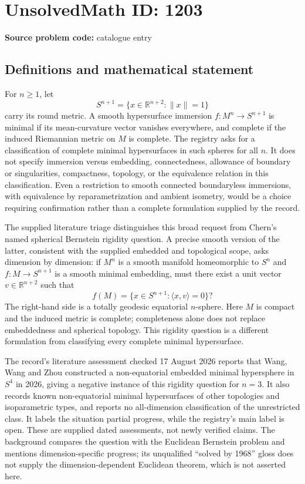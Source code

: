 \documentclass[11pt]{article}
\newcommand{\R}{\mathbb{R}}
\begin{document}
\section*{UnsolvedMath ID: 1203}
\textbf{Source problem code:} catalogue entry
\subsection{Definitions and mathematical statement}
For $n\ge1$, let
\[
 S^{n+1}=\{x\in\R^{n+2}:\|x\|=1\}
\]
carry its round metric. A smooth hypersurface immersion $f:M^n\to S^{n+1}$ is minimal if its mean-curvature vector vanishes everywhere, and complete if the induced Riemannian metric on $M$ is complete. The registry asks for a classification of complete minimal hypersurfaces in such spheres for all $n$. It does not specify immersion versus embedding, connectedness, allowance of boundary or singularities, compactness, topology, or the equivalence relation in this classification. Even a restriction to smooth connected boundaryless immersions, with equivalence by reparametrization and ambient isometry, would be a choice requiring confirmation rather than a complete formulation supplied by the record.

The supplied literature triage distinguishes this broad request from Chern's named spherical Bernstein rigidity question. A precise smooth version of the latter, consistent with the supplied embedded and topological scope, asks dimension by dimension: if $M^n$ is a smooth manifold homeomorphic to $S^n$ and $f:M\to S^{n+1}$ is a smooth minimal embedding, must there exist a unit vector $v\in\R^{n+2}$ such that
\[
 f(M)=\{x\in S^{n+1}:\langle x,v\rangle=0\}?
\]
The right-hand side is a totally geodesic equatorial $n$-sphere. Here $M$ is compact and the induced metric is complete; completeness alone does not replace embeddedness and spherical topology. This rigidity question is a different formulation from classifying every complete minimal hypersurface.

The record's literature assessment checked 17 August 2026 reports that Wang, Wang and Zhou constructed a non-equatorial embedded minimal hypersphere in $S^4$ in 2026, giving a negative instance of this rigidity question for $n=3$. It also records known non-equatorial minimal hypersurfaces of other topologies and isoparametric types, and reports no all-dimension classification of the unrestricted class. It labels the situation partial progress, while the registry's main label is open. These are supplied dated assessments, not newly verified claims. The background compares the question with the Euclidean Bernstein problem and mentions dimension-specific progress; its unqualified ``solved by 1968'' gloss does not supply the dimension-dependent Euclidean theorem, which is not asserted here.
\end{document}
